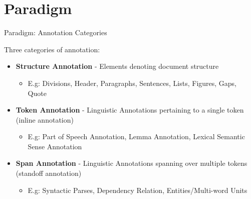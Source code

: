 \documentclass[compress]{beamer}
\begin{document}
        

\section{Paradigm}

\begin{frame}
    \begin{block}{Paradigm: Annotation Categories}
            
        
        Three categories of annotation:    
        \begin{itemize}            
            \item \textbf{Structure Annotation} - Elements denoting document structure
            \begin{itemize}
                \item {\footnotesize E.g: Divisions, Header, Paragraphs, Sentences, Lists, Figures, Gaps, Quote }
            \end{itemize}
            \item \textbf{Token Annotation} - Linguistic Annotations pertaining to a single token (inline annotation)
            \begin{itemize}
                \item {\footnotesize E.g: Part of Speech Annotation, Lemma Annotation, Lexical Semantic Sense Annotation }
            \end{itemize}
            \item \textbf{Span Annotation} - Linguistic Annotations spanning over multiple tokens (standoff annotation)
            \begin{itemize}
                \item {\footnotesize E.g: Syntactic Parses, Dependency Relation, Entities/Multi-word Units}
            \end{itemize}
        \end{itemize}
            
    \end{block}
\end{frame}
\end{document}
